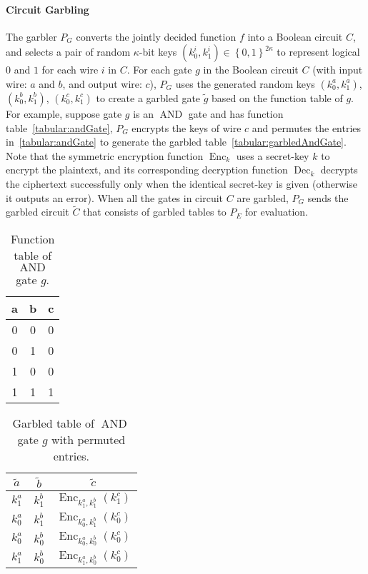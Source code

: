 \paragraph{Circuit Garbling}
The garbler $P_G$ converts the jointly decided function $f$ into a Boolean circuit $C$, and selects a pair of random $\kappa$-bit keys $\left(k_0^i,k_1^i\right)\in \left\{0,1\right\}^{2\kappa}$ to represent logical $0$ and $1$ for each wire $i$ in $C$. For each gate $g$ in the Boolean circuit $C$ (with input wire: $a$ and $b$, and output wire: $c$), $P_G$ uses the generated random keys $\left(k_0^a,k_1^a\right)$, $\left(k_0^b,k_1^b\right)$, $\left(k_0^c,k_1^c\right)$ to create a garbled gate $\tilde{g}$ based on the function table of $g$. For example, suppose gate $g$ is an $\operatorname{AND}$ gate and has function table~\autoref{tabular:andGate}, $P_G$ encrypts the keys of wire $c$ and permutes the entries in~\autoref{tabular:andGate} to generate the garbled table~\autoref{tabular:garbledAndGate}. Note that the symmetric encryption function $\operatorname{Enc}_k$ uses a secret-key $k$ to encrypt the plaintext, and its corresponding decryption function $\operatorname{Dec}_k$ decrypts the ciphertext successfully only when the identical secret-key is given (otherwise it outputs an error). When all the gates in circuit $C$ are garbled, $P_G$ sends the garbled circuit $\widetilde{C}$ that consists of garbled tables to $P_E$ for evaluation.

\begin{table}[htbp]
    \centering
    \begin{tabular}{|c|c||c|}

        a            & b & c \\
        \hline     0 & 0 & 0 \\
        0            & 1 & 0 \\
        1            & 0 & 0 \\
        1            & 1 & 1 \\
    \end{tabular}
    \caption{Function table of $\operatorname{AND}$ gate $g$.}
    \label{tabular:andGate}
\end{table}

\begin{table}[htbp]
    \centering
    \begin{tabular}{|c|c||c|}
        $\tilde{a}$ & $\tilde{b}$ & $\tilde{c}$                                           \\
        \hline
        $k_1^a$     & $k_1^b$     & $\operatorname{Enc}_{k_1^a, k_1^b}\left(k_1^c\right)$ \\
        $k_0^a$     & $k_1^b$     & $\operatorname{Enc}_{k_0^a, k_1^b}\left(k_0^c\right)$ \\
        $k_0^a$     & $k_0^b$     & $\operatorname{Enc}_{k_0^a, k_0^b}\left(k_0^c\right)$ \\
        $k_1^a$     & $k_0^b$     & $\operatorname{Enc}_{k_1^a, k_0^b}\left(k_0^c\right)$ \\
    \end{tabular}
    \caption{Garbled table of $\operatorname{AND}$ gate $g$ with permuted entries.}
    \label{tabular:garbledAndGate}
\end{table}

